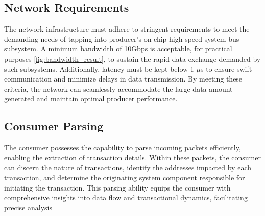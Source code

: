 \subsection{Network Requirements}
The network infrastructure must adhere to stringent requirements to meet the demanding needs of tapping into producer's on-chip high-speed system bus subsystem. A minimum bandwidth of 10Gbps is acceptable, for practical purposes \ref{fig:bandwidth_result}, to sustain the rapid data exchange demanded by such subsystems. %
Additionally, latency must be kept below 1 $\mu$s to ensure swift communication and minimize delays in data transmission. By meeting these criteria, the network can seamlessly accommodate the large data amount generated and maintain optimal producer performance.
\subsection{Consumer Parsing}
The consumer possesses the capability to parse incoming packets efficiently, enabling the extraction of transaction details. Within these packets, the consumer can discern the nature of transactions, identify the addresses impacted by each transaction, and determine the originating system component responsible for initiating the transaction. This parsing ability equips the consumer with comprehensive insights into data flow and transactional dynamics, facilitating precise analysis


